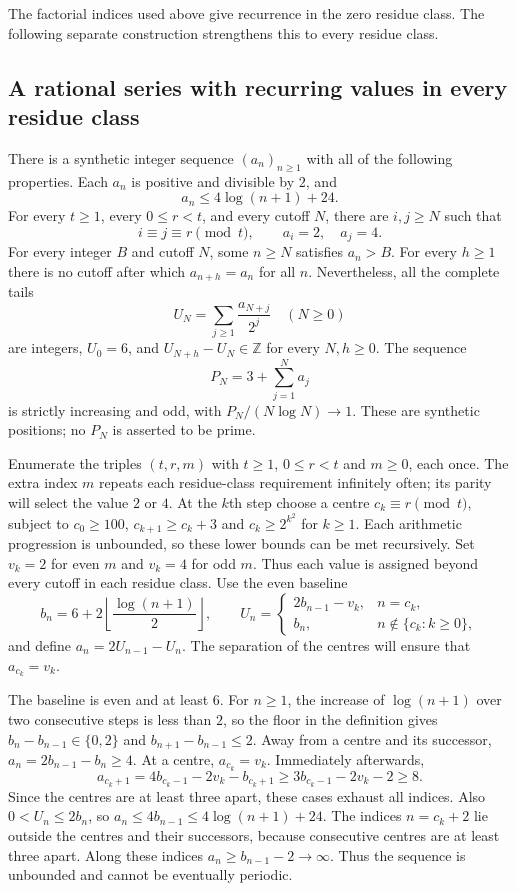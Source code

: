 The factorial indices used above give recurrence in the zero residue class.
The following separate construction strengthens this to every residue class.


\subsection{A rational series with recurring values in every residue class}
\label{long251:res:all-residue-log-countermodel}
There is a synthetic integer sequence $(a_n)_{n\ge1}$ with all of the
following properties.  Each $a_n$ is positive and divisible by $2$, and
\[
 a_n\le 4\log(n+1)+24.
\]
For every $t\ge1$, every $0\le r<t$, and every cutoff $N$, there are
$i,j\ge N$ such that
\[
 i\equiv j\equiv r\pmod t,\qquad a_i=2,\quad a_j=4.
\]
For every integer $B$ and cutoff $N$, some $n\ge N$ satisfies $a_n>B$.
For every $h\ge1$ there is no cutoff after which $a_{n+h}=a_n$ for all $n$.
Nevertheless, all the complete tails
\[
 U_N=\sum_{j\ge1}\frac{a_{N+j}}{2^j}\quad(N\ge0)
\]
are integers, $U_0=6$, and $U_{N+h}-U_N\in\mathbb Z$ for every $N,h\ge0$.
The sequence
\[
 P_N=3+\sum_{j=1}^{N}a_j
\]
is strictly increasing and odd, with $P_N/(N\log N)\to1$.
These are synthetic positions; no $P_N$ is asserted to be prime.

Enumerate the triples $(t,r,m)$ with $t\ge1$, $0\le r<t$ and $m\ge0$,
each once.  The extra index $m$ repeats each residue-class requirement
infinitely often; its parity will select the value $2$ or $4$.
At the $k$th step choose a centre $c_k\equiv r\pmod t$, subject to
$c_0\ge100$, $c_{k+1}\ge c_k+3$ and $c_k\ge2^{k^2}$ for $k\ge1$.
Each arithmetic progression is unbounded, so these lower bounds can be
met recursively.  Set $v_k=2$ for even $m$ and $v_k=4$ for odd $m$.
Thus each value is assigned beyond every cutoff in each residue class.
Use the even baseline
\[
 b_n=6+2\left\lfloor\frac{\log(n+1)}2\right\rfloor,
 \qquad
 U_n=\begin{cases}2b_{n-1}-v_k,&n=c_k,\\b_n,&n\notin\{c_k:k\ge0\},\end{cases}
\]
and define $a_n=2U_{n-1}-U_n$.  The separation of the centres will ensure
that $a_{c_k}=v_k$.

The baseline is even and at least $6$.  For $n\ge1$, the increase of
$\log(n+1)$ over two consecutive steps is less than $2$, so the floor
in the definition gives $b_n-b_{n-1}\in\{0,2\}$ and
$b_{n+1}-b_{n-1}\le2$.  Away from a centre and its successor,
$a_n=2b_{n-1}-b_n\ge4$.  At a centre, $a_{c_k}=v_k$.
Immediately afterwards,
\[
 a_{c_k+1}=4b_{c_k-1}-2v_k-b_{c_k+1}
 \ge3b_{c_k-1}-2v_k-2\ge8.
\]
Since the centres are at least three apart, these cases exhaust all
indices.  Also $0<U_n\le2b_n$, so
$a_n\le4b_{n-1}\le4\log(n+1)+24$.
The indices $n=c_k+2$ lie outside the centres and their successors,
because consecutive centres are at least three apart.  Along these
indices $a_n\ge b_{n-1}-2\to\infty$.  Thus the sequence is unbounded
and cannot be eventually periodic.

